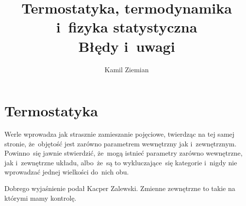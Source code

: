 \documentclass[a4paper,11pt]{article}
\title{Termostatyka, termodynamika i~fizyka statystyczna \\
  {\Large Błędy i~uwagi}}
\author{Kamil Ziemian}
\begin{document}





\maketitle %





\section{Termostatyka}

\vspace{\spaceTwo}




\vspace{0em}



\vspace{0em}


\noindent
{} Werle wprowadza jak strasznie zamieszanie pojęciowe,
twierdząc na tej samej stronie, że~objętość jest zarówno parametrem
wewnętrzny jak i~zewnętrznym. Powinno~się jawnie stwierdzić, że~mogą
istnieć parametry zarówno wewnętrzne, jak i~zewnętrzne układu,
albo~że~są to wykluczające~się kategorie i~nigdy nie wprowadzać jednej
wielkości do~nich obu.

Dobrego wyjaśnienie podał Kacper Zalewski. Zmienne zewnętrzne to takie
na którymi mamy kontrolę. 

\vspace{\spaceFour}



\noindent
{}





\noindent

\end{document}
